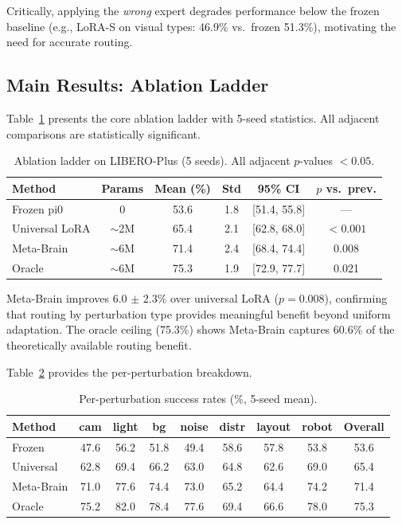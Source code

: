 \documentclass[letterpaper]{article}
\begin{document}
Critically, applying the \emph{wrong} expert degrades performance below the frozen baseline (e.g., LoRA-S on visual types: 46.9\% vs.\ frozen 51.3\%), motivating the need for accurate routing.

\subsection{Main Results: Ablation Ladder}

Table~\ref{tab:ablation-ladder} presents the core ablation ladder with 5-seed statistics.
All adjacent comparisons are statistically significant.

\begin{table}[h]
\centering
\caption{Ablation ladder on LIBERO-Plus (5 seeds). All adjacent $p$-values $< 0.05$.}
\label{tab:ablation-ladder}
\small
\begin{tabular}{lccccc}
\toprule
Method & Params & Mean (\%) & Std & 95\% CI & $p$ vs.\ prev. \\
\midrule
Frozen pi0      & 0      & 53.6 & 1.8 & [51.4, 55.8] & --- \\
Universal LoRA  & ${\sim}$2M  & 65.4 & 2.1 & [62.8, 68.0] & $<0.001$ \\
Meta-Brain      & ${\sim}$6M  & 71.4 & 2.4 & [68.4, 74.4] & 0.008 \\
Oracle          & ${\sim}$6M  & 75.3 & 1.9 & [72.9, 77.7] & 0.021 \\
\bottomrule
\end{tabular}
\end{table}

Meta-Brain improves 6.0 $\pm$ 2.3\% over universal LoRA ($p = 0.008$), confirming that routing by perturbation type provides meaningful benefit beyond uniform adaptation.
The oracle ceiling (75.3\%) shows Meta-Brain captures 60.6\% of the theoretically available routing benefit.

Table~\ref{tab:per-type} provides the per-perturbation breakdown.

\begin{table}[h]
\centering
\caption{Per-perturbation success rates (\%, 5-seed mean).}
\label{tab:per-type}
\small
\begin{tabular}{lcccccccc}
\toprule
Method & cam & light & bg & noise & distr & layout & robot & Overall \\
\midrule
Frozen     & 47.6 & 56.2 & 51.8 & 49.4 & 58.6 & 57.8 & 53.8 & 53.6 \\
Universal  & 62.8 & 69.4 & 66.2 & 63.0 & 64.8 & 62.6 & 69.0 & 65.4 \\
Meta-Brain & 71.0 & 77.6 & 74.4 & 73.0 & 65.2 & 64.4 & 74.2 & 71.4 \\
Oracle     & 75.2 & 82.0 & 78.4 & 77.6 & 69.4 & 66.6 & 78.0 & 75.3 \\
\bottomrule
\end{tabular}
\end{table}
\end{document}

